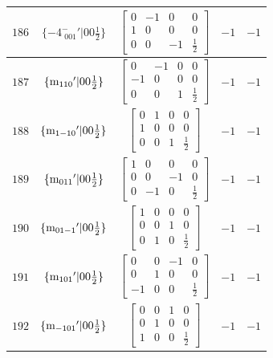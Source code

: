 \documentclass[fleqn,8pt]{jsarticle}
\begin{document}
\begin{longtable}{ccccc}
$ 186 $ & $ \{-4^{-}_{\,\,001}{}'|0 0 \frac{1}{2}\} $ & $ \begin{bmatrix} 0 & -1 & 0 & 0 \\ 1 & 0 & 0 & 0 \\ 0 & 0 & -1 & \frac{1}{2} \end{bmatrix} $ & $ -1 $ & $ -1 $ \\ \hline
$ 187 $ & $ \{{\rm m}_{110}{}'|0 0 \frac{1}{2}\} $ & $ \begin{bmatrix} 0 & -1 & 0 & 0 \\ -1 & 0 & 0 & 0 \\ 0 & 0 & 1 & \frac{1}{2} \end{bmatrix} $ & $ -1 $ & $ -1 $ \\ \hline
$ 188 $ & $ \{{\rm m}_{1-10}{}'|0 0 \frac{1}{2}\} $ & $ \begin{bmatrix} 0 & 1 & 0 & 0 \\ 1 & 0 & 0 & 0 \\ 0 & 0 & 1 & \frac{1}{2} \end{bmatrix} $ & $ -1 $ & $ -1 $ \\ \hline
$ 189 $ & $ \{{\rm m}_{011}{}'|0 0 \frac{1}{2}\} $ & $ \begin{bmatrix} 1 & 0 & 0 & 0 \\ 0 & 0 & -1 & 0 \\ 0 & -1 & 0 & \frac{1}{2} \end{bmatrix} $ & $ -1 $ & $ -1 $ \\ \hline
$ 190 $ & $ \{{\rm m}_{01-1}{}'|0 0 \frac{1}{2}\} $ & $ \begin{bmatrix} 1 & 0 & 0 & 0 \\ 0 & 0 & 1 & 0 \\ 0 & 1 & 0 & \frac{1}{2} \end{bmatrix} $ & $ -1 $ & $ -1 $ \\ \hline
$ 191 $ & $ \{{\rm m}_{101}{}'|0 0 \frac{1}{2}\} $ & $ \begin{bmatrix} 0 & 0 & -1 & 0 \\ 0 & 1 & 0 & 0 \\ -1 & 0 & 0 & \frac{1}{2} \end{bmatrix} $ & $ -1 $ & $ -1 $ \\ \hline
$ 192 $ & $ \{{\rm m}_{-101}{}'|0 0 \frac{1}{2}\} $ & $ \begin{bmatrix} 0 & 0 & 1 & 0 \\ 0 & 1 & 0 & 0 \\ 1 & 0 & 0 & \frac{1}{2} \end{bmatrix} $ & $ -1 $ & $ -1 $ \\
\end{longtable}
\end{document}
